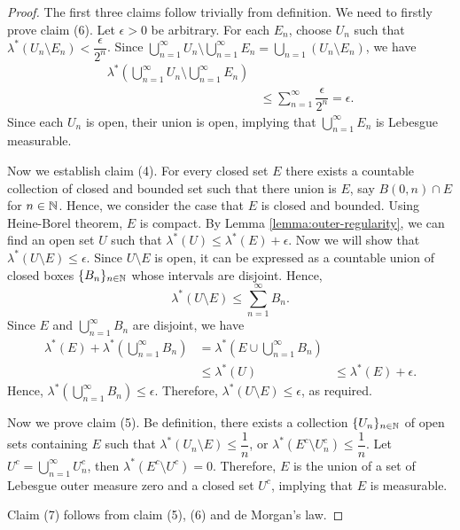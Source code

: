 \begin{proof}
  The first three claims follow trivially from definition. We need to firstly prove claim (6). Let $\epsilon>0$ be arbitrary. For each $E_n$, choose $U_n$ such that $\lambda^*(U_n\setminus E_n) < \dfrac{\epsilon}{2^n}$. Since $\bigcup\limits_{n=1}^\infty U_n \setminus \bigcup\limits_{n=1}^\infty E_n = \bigcup\limits_{n=1}(U_n\setminus E_n)$, we have
  \begin{align*}
    \lambda^*\left(\bigcup\limits_{n=1}^\infty U_n \setminus \bigcup\limits_{n=1}^\infty E_n \right) \\
     & \le \sum\limits_{n=1}^\infty \dfrac{\epsilon}{2^n} = \epsilon.
  \end{align*}
  Since each $U_n$ is open, their union is open, implying that $\bigcup\limits_{n=1}^\infty E_n$ is Lebesgue measurable.

  Now we establish claim (4). For every closed set $E$ there exists a countable collection of closed and bounded set such that there union is $E$, say $B(0,n)\cap E$ for $n\in\mathbb{N}$. Hence, we consider the case that $E$ is closed and bounded. Using Heine-Borel theorem, $E$ is compact. By Lemma \ref{lemma:outer-regularity}, we can find an open set $U$ such that $\lambda^*(U) \le \lambda^*(E) + \epsilon$. Now we will show that $\lambda^*(U\setminus E) \le \epsilon$. Since $U\setminus E$ is open, it can be expressed as a countable union of closed boxes $\{B_n\}_{n\in\mathbb{N}}$ whose intervals are disjoint. Hence,
  $$\lambda^*(U\setminus E) \le \sum\limits_{n=1}^\infty B_n.$$
  Since $E$ and $\bigcup\limits_{n=1}^\infty B_n$ are disjoint, we have
  \begin{align*}
    \lambda^*(E) + \lambda^*\left(\bigcup\limits_{n=1}^\infty B_n\right)
     & = \lambda^*\left(E\cup\bigcup\limits_{n=1}^\infty B_n\right) \\
     & \le \lambda^*(U)
     & \le \lambda^*(E) + \epsilon.
  \end{align*}
  Hence, $\lambda^*\left(\bigcup\limits_{n=1}^\infty B_n\right)\le\epsilon$. Therefore, $\lambda^*(U\setminus E) \le \epsilon$, as required.

  Now we prove claim (5). Be definition, there exists a collection $\{U_n\}_{n\in\mathbb{N}}$ of open sets containing $E$ such that $\lambda^*(U_n\setminus E)\le \dfrac{1}{n}$, or $\lambda^*(E^c\setminus U_n^c) \le \dfrac{1}{n}$. Let $U^c = \bigcup\limits_{n=1}^\infty U_n^c$, then $\lambda^*(E^c\setminus U^c) = 0$. Therefore, $E$ is the union of a set of Lebesgue outer measure zero and a closed set $U^c$, implying that $E$ is measurable.

  Claim (7) follows from claim (5), (6) and de Morgan's law.
\end{proof}

